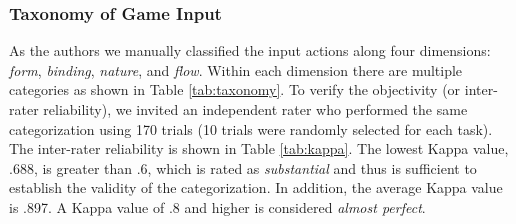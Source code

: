 \documentclass{sigchi}
\begin{document}
  \subsubsection{Taxonomy of Game Input}
       
  As the authors we manually classified the input actions along four dimensions: \emph{form}, \emph{binding}, \emph{nature}, and \emph{flow}. Within each dimension there are multiple categories as shown in Table \ref{tab:taxonomy}. To verify the objectivity (or inter-rater reliability), we invited an independent rater who performed the same categorization using 170 trials (10 trials were randomly selected for each task). The inter-rater reliability is shown in Table \ref{tab:kappa}. The lowest Kappa value, .688, is greater than .6, which is rated as \textsl{substantial} and thus is sufficient to establish the validity of the categorization. In addition, the average Kappa value is .897. A Kappa value of .8 and higher is considered \textsl{almost perfect}\cite{kappavalue}.
\end{document}
